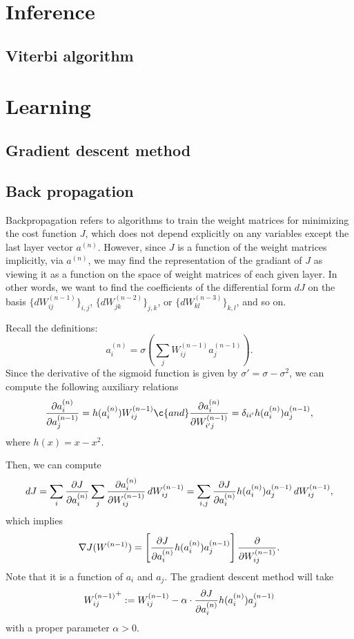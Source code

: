 \documentclass{../exp}
\begin{document}
\begin{ex}

\end{ex}

\begin{ex}

\end{ex}

\section{Inference}
\subsection{Viterbi algorithm}
\section{Learning}
\subsection{Gradient descent method}



\subsection{Back propagation}
Backpropagation refers to algorithms to train the weight matrices for minimizing the cost function $J$, which does not depend explicitly on any variables except the last layer vector $a^{(n)}$.
However, since $J$ is a function of the weight matrices implicitly, via $a^{(n)}$, we may find the representation of the gradiant of $J$ as viewing it as a function on the space of weight matrices of each given layer.
In other words, we want to find the coefficients of the differential form $dJ$ on the basis $\{dW_{ij}^{(n-1)}\}_{i,j}$, $\{dW_{jk}^{(n-2)}\}_{j,k}$, or $\{dW_{kl}^{(n-3)}\}_{k,l}$, and so on.

Recall the definitions:
\[a_i^{(n)}=\sigma\left(\sum_jW_{ij}^{(n-1)}a_j^{(n-1)}\right).\]
Since the derivative of the sigmoid function is given by $\sigma'=\sigma-\sigma^2$, we can compute the following auxiliary relations
\[\pd{a_i^{(n)}}{a_j^{(n-1)}}=h(a_i^{(n)})W_{ij}^{(n-1)}\c{and}\pd{a_i^{(n)}}{W_{i'j}^{(n-1)}}=\delta_{ii'}h(a_i^{(n)})a_j^{(n-1)},\]
where $h(x)=x-x^2$.

Then, we can compute
\[dJ=\sum_i\pd{J}{a_i^{(n)}}\sum_j\pd{a_i^{(n)}}{W_{ij}^{(n-1)}}\,dW_{ij}^{(n-1)}=\sum_{i,j}\pd{J}{a_i^{(n)}}h(a_i^{(n)})a_j^{(n-1)}\,dW_{ij}^{(n-1)},\]
which implies
\[\del J(W^{(n-1)})=\left[\pd{J}{a_i^{(n)}}h(a_i^{(n)})a_j^{(n-1)}\right]\pd{W_{ij}^{(n-1)}}.\]
Note that it is a function of $a_i$ and $a_j$.
The gradient descent method will take
\[{W_{ij}^{(n-1)}}^+:=W_{ij}^{(n-1)}-\alpha\cdot\pd{J}{a_i^{(n)}}h(a_i^{(n)})a_j^{(n-1)}\]
with a proper parameter $\alpha>0$.
\end{document}
